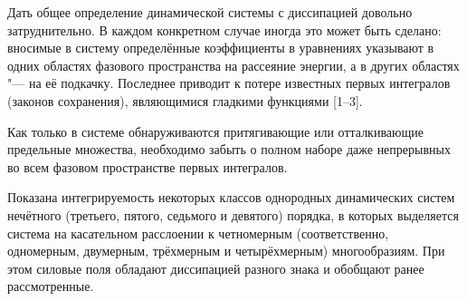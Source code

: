 
\vzmscaption





Дать общее определение динамической системы с диссипацией довольно
затруднительно. В каждом конкретном случае иногда это может быть
сделано: вносимые в систему определённые коэффициенты в уравнениях
указывают в одних областях фазового пространства на рассеяние
энергии, а в других областях "--- на её подкачку. Последнее приводит
к потере известных первых интегралов (законов сохранения),
являющимися гладкими функциями [1--3].

Как только в системе обнаруживаются притягивающие или отталкивающие
предельные множества, необходимо забыть о полном наборе даже
непрерывных во всем фазовом пространстве первых интегралов.

Показана интегрируемость некоторых классов однородных динамических
систем нечётного (третьего, пятого, седьмого и девятого) порядка, в
которых выделяется система на касательном расслоении к четномерным
(соответственно, одномерным, двумерным, трёхмерным и четырёхмерным)
многообразиям. При этом силовые поля обладают диссипацией разного
знака и обобщают ранее рассмотренные.

